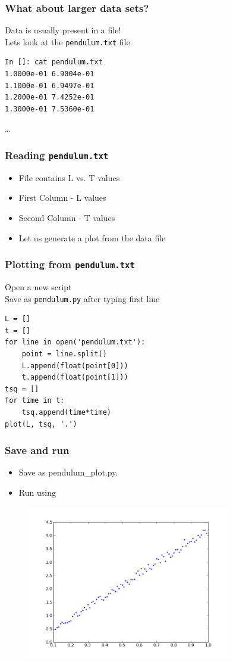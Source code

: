 \documentclass[14pt,compress]{beamer}
\newcounter{time}
\newcommand{\typ}[1]{\lstinline{#1}}
\newcommand{\kwrd}[1]{ \texttt{\textbf{\color{blue}{#1}}}  }
\begin{document}
\begin{frame}[fragile]
\frametitle{What about larger data sets?}
\alert{Data is usually present in a file!} \\
Lets look at the \typ{pendulum.txt} file.
\begin{lstlisting} 
In []: cat pendulum.txt 
1.0000e-01 6.9004e-01
1.1000e-01 6.9497e-01
1.2000e-01 7.4252e-01
1.3000e-01 7.5360e-01
\end{lstlisting}  %
\ldots
\end{frame}

\begin{frame}[fragile]
\frametitle{Reading \typ{pendulum.txt}}
\begin{itemize}
  \item File contains L vs. T values 
  \item First Column - L values
  \item Second Column - T values
  \item Let us generate a plot from the data file
\end{itemize}
\end{frame}

\begin{frame}[fragile]
\frametitle{Plotting from \typ{pendulum.txt}}
Open a new script\\
Save as \typ{pendulum.py} after typing first line
\begin{lstlisting}
L = []
t = []
for line in open('pendulum.txt'):
    point = line.split()
    L.append(float(point[0]))
    t.append(float(point[1]))
tsq = []
for time in t:
    tsq.append(time*time)
plot(L, tsq, '.')
\end{lstlisting}
\end{frame}

\begin{frame}
\frametitle{Save and run}
\begin{itemize}
  \item Save as pendulum\_plot.py.
  \item Run using \kwrd{\%run -i pendulum\_plot.py}
\end{itemize}
\end{frame}

\begin{frame}[fragile]
\begin{figure}
\includegraphics[width=3.5in]{data/L-Tsq.png}
\end{figure}
\end{frame}
\end{document}
